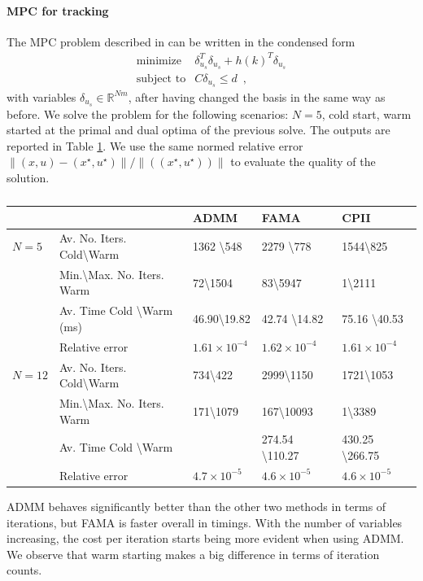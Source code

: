 \documentclass[openany]{now}
\newcommand{\reals}{{\mathbb R}}
\begin{document}
\paragraph{MPC for tracking} The MPC problem described in \cite[Section~II]{B747} can be written in the condensed form
\begin{equation}   \label{eq:MPC}
  \begin{array}{ll}
    \mbox{minimize} & \delta_{u_s}^T\delta_{u_s} + h(k)^T\delta_{u_s}  \\
    \mbox{subject to} & C \delta_{u_s}\le d\enspace,
  \end{array}
\end{equation}
with variables $\delta_{u_s}\in\reals^{Nm}$, after having changed the basis in the same way as before. We solve the problem for the following scenarios: $N=5$, cold start, warm started at the primal and dual optima of the previous solve. The outputs are reported in Table \ref{table:B747_MPC}. We use the same normed relative error $\|(x,u)-(x^\star,u^\star)\| / \|((x^\star,u^\star))\|$ to evaluate the quality of the solution.
\begin{table}[t]
  \centering
    \begin{tabular}{ | p{1.5cm} | p{2.5cm} | p{1.5cm} | p{1.5cm} | p{1.5cm} |}
    \hline
     & & ADMM & FAMA & CPII \\ \hline
     $N=5$ & Av. No. Iters. Cold\textbackslash Warm  &  1362 \textbackslash 548 & 2279 \textbackslash 778 & 1544\textbackslash 825\\ \hline
           & Min.\textbackslash Max. No. Iters. Warm & 72\textbackslash 1504 & 83\textbackslash 5947 & 1\textbackslash2111\\ \hline
           & Av. Time Cold \textbackslash Warm (ms) & 46.90\textbackslash 19.82 &  42.74 \textbackslash 14.82 & 75.16 \textbackslash 40.53\\ \hline
           & Relative error & $1.61\times10^{-4}$ & $1.62\times10^{-4}$ & $1.61\times10^{-4}$\\ \hline\hline
    $N=12$ & Av. No. Iters. Cold\textbackslash Warm  &   734\textbackslash 422 &  2999\textbackslash 1150  & 1721\textbackslash 1053\\ \hline
           & Min.\textbackslash Max. No. Iters. Warm & 171\textbackslash 1079 & 167\textbackslash 10093 & 1\textbackslash3389\\ \hline
           & Av. Time Cold \textbackslash Warm &  & 274.54 \textbackslash 110.27 & 430.25 \textbackslash 266.75 \\ \hline
           & Relative error & $4.7\times10^{-5}$ & $4.6\times10^{-5}$ & $4.6\times10^{-5}$\\ \hline\hline
    \end{tabular}
    \caption{}
    {\label{table:B747_MPC}}
\end{table}
ADMM behaves significantly better than the other two methods in terms of iterations, but FAMA is faster overall in timings. With the number of variables increasing, the cost per iteration starts being more evident when using ADMM. We observe that warm starting makes a big difference in terms of iteration counts.
\end{document}
